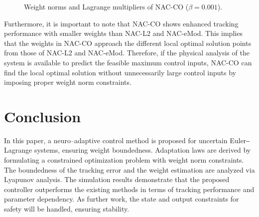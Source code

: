\documentclass[letterpaper, 10 pt, conference]{ieeeconf}  %
\begin{document}
\begin{figure}[!t]      
    \centering
    \vfill
    \caption{Weight norms and Lagrange multipliers of NAC-CO ($\beta=0.001$).}
    \label{fig: weight and multiplier}
\end{figure}

Furthermore, it is important to note that NAC-CO shows enhanced tracking performance with smaller weights than NAC-L2 and NAC-eMod.
This implies that the weights in NAC-CO approach the different local optimal solution points from those of NAC-L2 and NAC-eMod.
Therefore, if the physical analysis of the system is available to predict the feasible maximum control inputs, NAC-CO can find the local optimal solution without unnecessarily large control inputs by imposing proper weight norm constraints.


\section{Conclusion}\label{sec:conclusion}

\color{black}
In this paper, a neuro–adaptive control method is proposed for uncertain Euler‒Lagrange systems, ensuring weight boundedness.
Adaptation laws are derived by formulating a constrained optimization problem with weight norm constraints.
The boundedness of the tracking error and the weight estimation are analyzed via Lyapunov analysis.
The simulation results demonstrate that the proposed controller outperforms the existing methods in terms of tracking performance and parameter dependency.
As further work, the state and output constraints for safety will be handled, ensuring stability.
\color{black}
\end{document}
